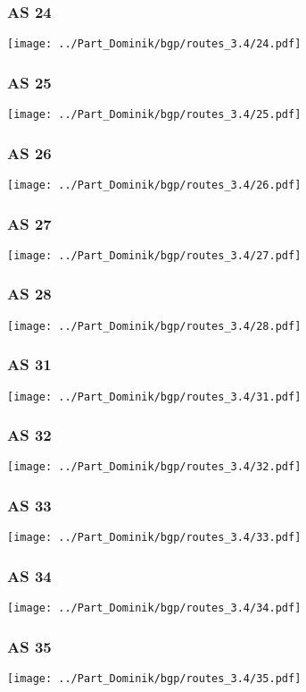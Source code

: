 \subsubsection{AS 24}
\texttt{[image: ../Part\_Dominik/bgp/routes\_3.4/24.pdf]}
\clearpage
\subsubsection{AS 25}
\texttt{[image: ../Part\_Dominik/bgp/routes\_3.4/25.pdf]}
\clearpage
\subsubsection{AS 26}
\texttt{[image: ../Part\_Dominik/bgp/routes\_3.4/26.pdf]}
\clearpage
\subsubsection{AS 27}
\texttt{[image: ../Part\_Dominik/bgp/routes\_3.4/27.pdf]}
\clearpage
\subsubsection{AS 28}
\texttt{[image: ../Part\_Dominik/bgp/routes\_3.4/28.pdf]}
\clearpage
\subsubsection{AS 31}
\texttt{[image: ../Part\_Dominik/bgp/routes\_3.4/31.pdf]}
\clearpage
\subsubsection{AS 32}
\texttt{[image: ../Part\_Dominik/bgp/routes\_3.4/32.pdf]}
\clearpage
\subsubsection{AS 33}
\texttt{[image: ../Part\_Dominik/bgp/routes\_3.4/33.pdf]}
\clearpage
\subsubsection{AS 34}
\texttt{[image: ../Part\_Dominik/bgp/routes\_3.4/34.pdf]}
\clearpage
\subsubsection{AS 35}
\texttt{[image: ../Part\_Dominik/bgp/routes\_3.4/35.pdf]}
\clearpage
